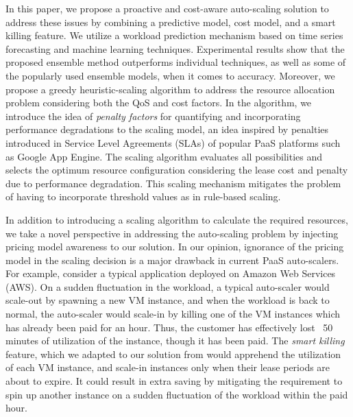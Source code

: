 In this paper, we propose a proactive and cost-aware auto-scaling solution to address these issues by combining a predictive model, cost model, and a smart killing feature. We utilize a workload prediction mechanism based on time series forecasting and machine learning techniques. Experimental results show that the proposed ensemble method outperforms individual techniques, as well as some of the popularly used ensemble models, when it comes to accuracy. Moreover, we propose a greedy heuristic-scaling algorithm to address the resource allocation problem considering both the QoS and cost factors. In the algorithm, we introduce the idea of \textit{penalty factors} for quantifying and incorporating performance degradations to the scaling model, an idea inspired by penalties introduced in Service Level Agreements (SLAs) of popular PaaS platforms such as Google App Engine. The scaling algorithm evaluates all possibilities and selects the optimum resource configuration considering the lease cost and penalty due to performance degradation. This scaling mechanism mitigates the problem of having to incorporate threshold values as in rule-based scaling.

In addition to introducing a scaling algorithm to calculate the required resources, we take a novel perspective in addressing the auto-scaling problem by injecting pricing model awareness to our solution. In our opinion, ignorance of the pricing model in the scaling decision is a major drawback in current PaaS auto-scalers. For example, consider a typical application deployed on Amazon Web Services (AWS). On a sudden fluctuation in the workload, a typical auto-scaler would scale-out by spawning a new VM instance, and when the workload is back to normal, the auto-scaler would scale-in by killing one of the VM instances which has already been paid for an hour. Thus, the customer has effectively lost ~50 minutes of utilization of the instance, though it has been paid. The \textit{smart killing} feature, which we adapted to our solution from \cite{Bunch_2012} would apprehend the utilization of each VM instance, and scale-in instances only when their lease periods are about to expire. It could result in extra saving by mitigating the requirement to spin up another instance on a sudden fluctuation of the workload within the paid hour.

